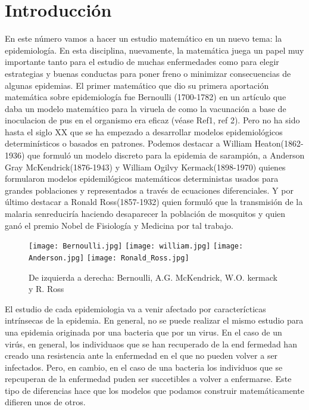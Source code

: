 \section{Introducción}
En este número vamos a hacer un estudio matemático en un nuevo tema: la epidemiología. En esta disciplina, nuevamente, la matemática juega un papel muy importante tanto para el estudio de muchas enfermedades como para  elegir estrategias y buenas conductas para poner freno o minimizar consecuencias de algunas epidemias. El primer matemático que dio su primera aportación matemática sobre epidemiología fue Bernoulli (1700-1782) en un artículo que daba un modelo matemático para la viruela de como la vacunación a base de inoculacion de pus en el organismo era eficaz (véase Ref1, ref 2). Pero no ha sido  hasta el siglo XX que se ha empezado a desarrollar modelos epidemiológicos determinísticos o basados en patrones. Podemos destacar a William Heaton(1862-1936) que formuló un modelo discreto para la epidemia de sarampión, a Anderson Gray McKendrick(1876-1943) y William Ogilvy Kermack(1898-1970) quienes formularon modelos epidemilógicos matemáticos deterministas usados para grandes poblaciones y representados a través de ecuaciones diferenciales. Y por último destacar a Ronald Ross(1857-1932) quien formuló que la transmisión de la malaria senreduciría haciendo desaparecer la población de mosquitos y quien ganó el premio Nobel de Fisiología y Medicina por tal trabajo.
\begin{figure}
\begin{figurebox}\centering
\texttt{[image: Bernoulli.jpg]}
 \texttt{[image: william.jpg]}
 \texttt{[image: Anderson.jpg]} 
\texttt{[image: Ronald\_Ross.jpg]} \caption{De izquierda a derecha: Bernoulli, A.G. McKendrick, W.O. kermack y R. Ross}
\end{figurebox}
\end{figure}
El estudio de cada epidemiologia va a venir afectado por caracterícticas intrínsecas de la epidemia. En general, no se puede realizar el mismo estudio para una epidemia originada por una bacteria que por un virus. En el caso de un virús, en general, los individuaos que se han recuperado de la end fermedad han creado una resistencia ante la enfermedad en el que no pueden volver a ser infectados. Pero, en cambio, en el caso de una bacteria los individuos que se repcuperan de la enfermedad puden ser succetibles a volver a enfermarse. Este tipo de diferencias hace que los modelos que podamos construir matemáticamente difieren unos de otros. 

